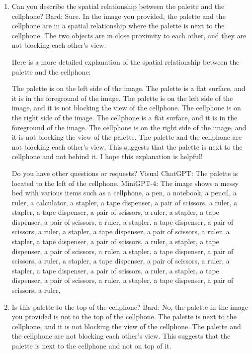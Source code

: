 \begin{enumerate}
    \item Can you describe the spatial relationship between the palette and the cellphone?
    \subitem Bard: 
    Sure. In the image you provided, the palette and the cellphone are in a spatial relationship where the palette is next to the cellphone. The two objects are in close proximity to each other, and they are not blocking each other's view.
    
    Here is a more detailed explanation of the spatial relationship between the palette and the cellphone:
    
    The palette is on the left side of the image. The palette is a flat surface, and it is in the foreground of the image. The palette is on the left side of the image, and it is not blocking the view of the cellphone.
    The cellphone is on the right side of the image. The cellphone is a flat surface, and it is in the foreground of the image. The cellphone is on the right side of the image, and it is not blocking the view of the palette.
    The palette and the cellphone are not blocking each other's view. This suggests that the palette is next to the cellphone and not behind it.
    I hope this explanation is helpful!
    
    Do you have other questions or requests?
    \subitem Visual ChatGPT: The palette is located to the left of the cellphone.
    \subitem MiniGPT-4: The image shows a messy bed with various items such as a cellphone, a pen, a notebook, a pencil, a ruler, a calculator, a stapler, a tape dispenser, a pair of scissors, a ruler, a stapler, a tape dispenser, a pair of scissors, a ruler, a stapler, a tape dispenser, a pair of scissors, a ruler, a stapler, a tape dispenser, a pair of scissors, a ruler, a stapler, a tape dispenser, a pair of scissors, a ruler, a stapler, a tape dispenser, a pair of scissors, a ruler, a stapler, a tape dispenser, a pair of scissors, a ruler, a stapler, a tape dispenser, a pair of scissors, a ruler, a stapler, a tape dispenser, a pair of scissors, a ruler, a stapler, a tape dispenser, a pair of scissors, a ruler, a stapler, a tape dispenser, a pair of scissors, a ruler, a stapler, a tape dispenser, a pair of scissors, a ruler,
    \item Is this palette to the top of the cellphone?
    \subitem Bard: No, the palette in the image you provided is not to the top of the cellphone. The palette is next to the cellphone, and it is not blocking the view of the cellphone. The palette and the cellphone are not blocking each other's view. This suggests that the palette is next to the cellphone and not on top of it.


\end{enumerate}
